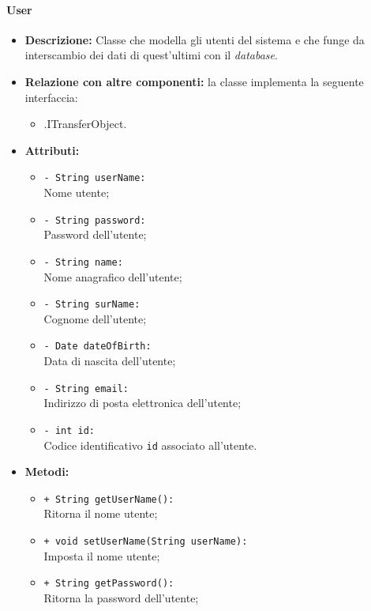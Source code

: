 \paragraph{User}
\label{botuser}
\begin{flushleft}
\begin{itemize}
\item \textbf{Descrizione:} Classe che modella gli utenti del sistema e che funge da interscambio dei dati di quest'ultimi con il \textit{database}.
\item \textbf{Relazione con altre componenti:} la classe implementa la seguente interfaccia:
		\begin{itemize}
			\item \smodel{}.ITransferObject.
		\end{itemize}
\item \textbf{Attributi:}
\begin{sloppypar}
\begin{itemize}
\item \texttt{- String userName:}\\ Nome utente;
\item \texttt{- String password:}\\ Password dell'utente;
\item \texttt{- String name:}\\Nome anagrafico dell'utente;
\item \texttt{- String surName:}\\Cognome dell'utente;
\item \texttt{- Date dateOfBirth:}\\Data di nascita dell'utente;
\item \texttt{- String email:}\\Indirizzo di posta elettronica dell'utente;
\item \texttt{- int id:}\\Codice identificativo \texttt{id} associato all'utente.
\end{itemize}
\end{sloppypar}
\item \textbf{Metodi:}
\begin{sloppypar}
\begin{itemize}
\item \texttt{+ String getUserName():}\\ Ritorna il nome utente;
\item \texttt{+ void setUserName(String userName):}\\ Imposta il nome utente;
\item \texttt{+ String getPassword():}\\ Ritorna la password dell'utente;

\end{itemize}
\end{sloppypar}
\end{itemize}
\end{flushleft}

